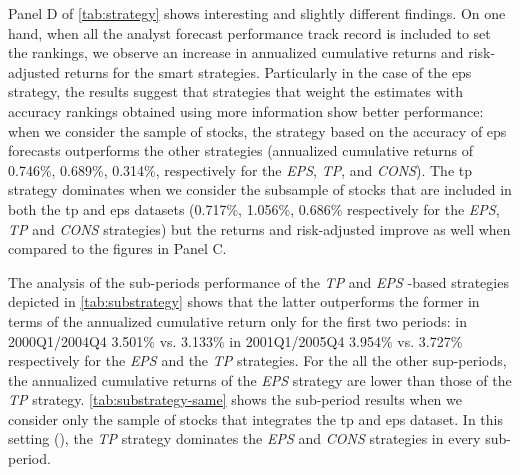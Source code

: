 \documentclass[a4paper,twoside,12pt,openright,notitlepage]{report}\usepackage[]{graphicx}\usepackage[]{color}
\begin{document}
Panel D of \ref{tab:strategy} shows interesting and slightly different findings. On one hand, when all the analyst forecast performance track record is included to set the rankings, we observe an increase in annualized cumulative returns and risk-adjusted returns for the smart strategies. Particularly in the case of the \gls{eps} strategy, the results suggest that strategies that weight the estimates with accuracy rankings obtained using more information show better performance: when we consider the \all{} sample of stocks, the strategy based on the accuracy of \gls{eps} forecasts outperforms the other strategies (annualized cumulative returns of 0.746\%, 0.689\%, 0.314\%, respectively for the \textit{EPS}, \textit{TP}, and \textit{CONS}). The \gls{tp} strategy dominates when we consider the subsample of stocks that are included in both the \gls{tp} and \gls{eps} datasets (0.717\%, 1.056\%, 0.686\% respectively for the \textit{EPS}, \textit{TP} and \textit{CONS} strategies) but the returns and risk-adjusted improve as well when compared to the figures in Panel C.




The analysis of the sub-periods performance of the \textit{TP} and \textit{EPS} -based strategies depicted in \ref{tab:substrategy} shows that the latter outperforms the former in terms of the annualized cumulative return only for the first two periods: in  2000Q1/2004Q4  3.501\% vs. 3.133\%  in 2001Q1/2005Q4 3.954\%  vs. 3.727\% respectively for the \textit{EPS} and the \textit{TP} strategies. For the all the other sup-periods, the annualized cumulative returns of the \textit{EPS} strategy are lower than those of the \textit{TP} strategy.
\ref{tab:substrategy-same} shows the sub-period results when we consider only the sample of stocks that integrates the \gls{tp} and \gls{eps} dataset. In this setting (\same{}), the \textit{TP} strategy dominates the \textit{EPS} and \textit{CONS} strategies in every sub-period.
\end{document}
